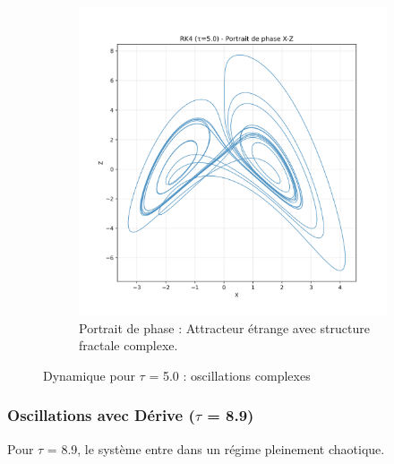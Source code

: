 \begin{figure}[H]
\begin{subfigure}[b]{0.3\textwidth}
        \includegraphics[width=\textwidth]{figures/rk4/rk4_tau5.0_phase}
        \caption{Portrait de phase : Attracteur étrange avec structure fractale complexe.}
    \end{subfigure}
    \caption{Dynamique pour $\tau$ = 5.0 : oscillations complexes}
    \label{fig:rk4_tau5.0}
\end{figure}

\subsubsection{Oscillations avec Dérive ($\tau$ = 8.9)}
Pour $\tau$ = 8.9, le système entre dans un régime pleinement chaotique.


